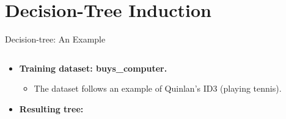 \section{Decision-Tree Induction}

\begin{frame}{Decision-tree: An Example}
	\begin{columns}
		\begin{column}{0.38\textwidth}
			\vspace{-3cm}
			\begin{itemize}
				\item \textbf{Training dataset: buys\_computer.}
				      \begin{itemize}
					      \item The dataset follows an example of Quinlan's ID3 (playing tennis).
				      \end{itemize}
				\item \textbf{Resulting tree:}\\[0.1cm]
			\end{itemize}
			\centering
			
		\end{column}
		\begin{column}{0.62\textwidth}
			\small
			
		\end{column}
	\end{columns}
\end{frame}


